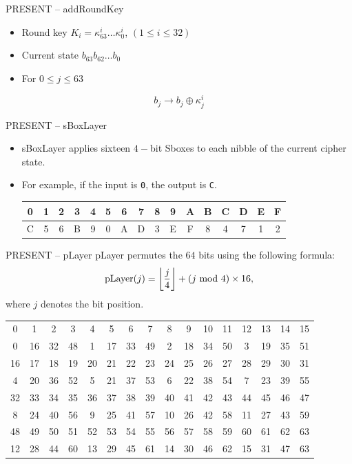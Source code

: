 \begin{frame}{PRESENT -- addRoundKey}
    \begin{itemize}
        \item Round key $K_i=\kappa^i_{63}\dots\kappa_0^i$, $(1\leq i\leq 32)$
        \item Current state $b_{63}b_{62}\dots b_0$
        \item For $0\leq j\leq 63$
    \end{itemize}
    \[
b_j\to b_j\oplus\kappa_j^i
\]
\end{frame}

\begin{frame}{PRESENT -- sBoxLayer}
    \begin{itemize}
        \item sBoxLayer applies sixteen $4-$bit Sboxes to each nibble of the current cipher state.
        \item For example, if the input is \texttt{0}, the output is \texttt{C}.
\begin{table}[htb]
\centering
\ttfamily
\begin{tabular}{cccccccccccccccc}\hline
 0 & 1 & 2 & 3 & 4 & 5 & 6 & 7 & 8 & 9 & A & B & C & D & E & F \\\hline
 C & 5 & 6 & B & 9 & 0 & A & D & 3 & E & F & 8 & 4 & 7 & 1 & 2\\\hline
\end{tabular}
\end{table}
    \end{itemize}
\end{frame}


\begin{frame}{PRESENT -- pLayer}
pLayer permutes the $64$ bits using the following formula:
\[
\text{pLayer}(j)=\left\lfloor\frac{j}{4}\right\rfloor+(j\textrm{~mod~} 4)\times16,
\]
where $j$ denotes the bit position.
\begin{table}[htb]
\centering
\begin{tabular}{cccccccccccccccc}\hline
0 & 1 & 2 & 3 & 4 & 5 & 6 & 7 & 8 & 9 & 10 & 11 & 12 & 13 & 14 & 15 \\
0 & 16 & 32 & 48 & 1 & 17 & 33 & 49 & 2 & 18 & 34 & 50 & 3 & 19 & 35 & 51 \\\hline
16 & 17 & 18 & 19 & 20 & 21 & 22 & 23 & 24 & 25 & 26 & 27 & 28 & 29 & 30 & 31 \\
4 & 20 & 36 & 52 & 5 & 21 & 37 & 53 & 6 & 22 & 38 & 54 & 7 & 23 & 39 & 55 \\\hline
32 & 33 & 34 & 35 & 36 & 37 & 38 & 39 & 40 & 41 & 42 & 43 & 44 & 45 & 46 & 47 \\
8 & 24 & 40 & 56 & 9 & 25 & 41 & 57 & 10 & 26 & 42 & 58 & 11 & 27 & 43 & 59 \\\hline
48 & 49 & 50 & 51 & 52 & 53 & 54 & 55 & 56 & 57 & 58 & 59 & 60 & 61 & 62 & 63 \\
12 & 28 & 44 & 60 & 13 & 29 & 45 & 61 & 14 & 30 & 46 & 62 & 15 & 31 & 47 & 63\\\hline
\end{tabular}
\end{table}
\end{frame}

